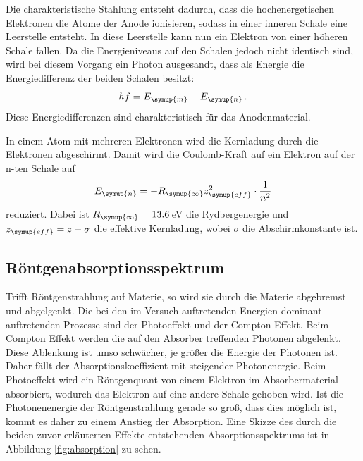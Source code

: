 Die charakteristische Stahlung entsteht dadurch, dass die hochenergetischen Elektronen
die Atome der Anode ionisieren, sodass in einer inneren Schale eine Leerstelle entsteht.
In diese Leerstelle kann nun ein Elektron von einer höheren Schale fallen. Da die
Energieniveaus auf den Schalen jedoch nicht identisch sind, wird bei diesem Vorgang
ein Photon ausgesandt, dass als Energie die Energiedifferenz der beiden Schalen besitzt:
\begin{equation}
  hf=E_{\symup{m}}-E_{\symup{n}} \,.
\end{equation}
Diese Energiedifferenzen sind charakteristisch für das Anodenmaterial.

In einem Atom mit mehreren Elektronen wird die Kernladung durch die Elektronen
abgeschirmt. Damit wird die Coulomb-Kraft auf ein Elektron auf der n-ten Schale auf
\begin{equation}
  E_{\symup{n}}=-R_{\symup{\infty}} z_{\symup{eff}}^2 \cdot \frac{1}{n^2}
  \label{eqn:bindungsenergie}
\end{equation}
reduziert. Dabei ist $R_{\symup{\infty}}=13.6\,$eV die Rydbergenergie und
$z_{\symup{eff}}=z-\sigma$ die effektive Kernladung, wobei $\sigma$ die
Abschirmkonstante ist.



\subsection{Röntgenabsorptionsspektrum}
\label{sec:Theorie_absorption}

Trifft Röntgenstrahlung auf Materie, so wird sie durch die Materie abgebremst und
abgelgenkt. Die bei den im Versuch auftretenden Energien dominant auftretenden
Prozesse sind der Photoeffekt und der Compton-Effekt.
Beim Compton Effekt werden die auf den Absorber treffenden Photonen abgelenkt.
Diese Ablenkung ist umso schwächer, je größer die Energie der Photonen ist. Daher
fällt der Absorptionskoeffizient mit steigender Photonenergie.
Beim Photoeffekt wird ein Röntgenquant von einem Elektron im Absorbermaterial absorbiert,
wodurch das Elektron auf eine andere Schale gehoben wird. Ist die Photonenenergie der
Röntgenstrahlung gerade so groß, dass dies möglich ist, kommt es daher zu einem
Anstieg der Absorption.
Eine Skizze des durch die beiden zuvor erläuterten Effekte entstehenden Absorptionsspektrums
ist in Abbildung \ref{fig:absorption} zu sehen.

